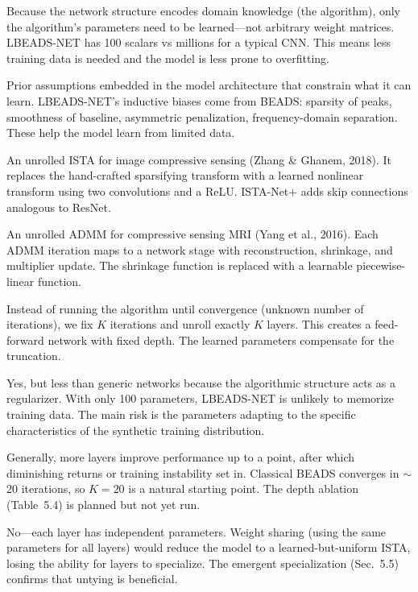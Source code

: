 \documentclass[11pt, letterpaper]{article}
\begin{document}
{Because the network structure encodes domain knowledge (the algorithm), only the algorithm's parameters need to be learned---not arbitrary weight matrices.  LBEADS-NET has 100 scalars vs millions for a typical CNN.  This means less training data is needed and the model is less prone to overfitting.}

{Prior assumptions embedded in the model architecture that constrain what it can learn.  LBEADS-NET's inductive biases come from BEADS: sparsity of peaks, smoothness of baseline, asymmetric penalization, frequency-domain separation.  These help the model learn from limited data.}

{An unrolled ISTA for image compressive sensing (Zhang \& Ghanem, 2018).  It replaces the hand-crafted sparsifying transform with a learned nonlinear transform using two convolutions and a ReLU.  ISTA-Net+ adds skip connections analogous to ResNet.}

{An unrolled ADMM for compressive sensing MRI (Yang et al., 2016).  Each ADMM iteration maps to a network stage with reconstruction, shrinkage, and multiplier update.  The shrinkage function is replaced with a learnable piecewise-linear function.}

{Instead of running the algorithm until convergence (unknown number of iterations), we fix $K$ iterations and unroll exactly $K$ layers.  This creates a feed-forward network with fixed depth.  The learned parameters compensate for the truncation.}

{Yes, but less than generic networks because the algorithmic structure acts as a regularizer.  With only 100 parameters, LBEADS-NET is unlikely to memorize training data.  The main risk is the parameters adapting to the specific characteristics of the synthetic training distribution.}

{Generally, more layers improve performance up to a point, after which diminishing returns or training instability set in.  Classical BEADS converges in $\sim$20 iterations, so $K = 20$ is a natural starting point.  The depth ablation (Table~5.4) is planned but not yet run.}

{No---each layer has independent parameters.  Weight sharing (using the same parameters for all layers) would reduce the model to a learned-but-uniform ISTA, losing the ability for layers to specialize.  The emergent specialization (Sec.~5.5) confirms that untying is beneficial.}
\end{document}
